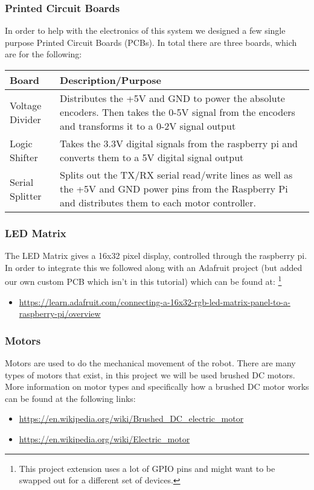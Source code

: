 \documentclass[12pt]{article}
\begin{document}
\subsubsection{Printed Circuit Boards}
In order to help with the electronics of this system we designed a few single purpose Printed Circuit Boards (PCBs). In total there are three boards, which are for the following:
\bigskip

\begin{tabular}[2]{| p{5cm} | p{10cm} | }
	\hline
	\textbf{Board} & \textbf{Description/Purpose} \\ \hline
	Voltage Divider & Distributes the +5V and GND to power the absolute encoders. Then takes the 0-5V signal from the encoders and transforms it to a 0-2V signal output \\ \hline
	Logic Shifter & Takes the 3.3V digital signals from the raspberry pi and converts them to a 5V digital signal output \\ \hline
	Serial Splitter & Splits out the TX/RX serial read/write lines as well as the +5V and GND power pins from the Raspberry Pi and distributes them to each motor controller. \\ \hline
\end{tabular}
\bigskip

\subsubsection{LED Matrix}
The LED Matrix gives a 16x32 pixel display, controlled through the raspberry pi. In order to integrate this we followed along with an Adafruit project (but added our own custom PCB which isn't in this tutorial) which can be found at: \footnote{This project extension uses a lot of GPIO pins and might want to be swapped out for a different set of devices.} 
\begin{itemize}
  \item \href{https://learn.adafruit.com/connecting-a-16x32-rgb-led-matrix-panel-to-a-raspberry-pi/overview}{https://learn.adafruit.com/connecting-a-16x32-rgb-led-matrix-panel-to-a-raspberry-pi/overview}
\end{itemize}

\subsubsection{Motors}
Motors are used to do the mechanical movement of the robot. There are many types of motors that exist, in this project we will be used brushed DC motors. More information on motor types and specifically how a brushed DC motor works can be found at the following links:
\begin{itemize}
	\item \href{https://en.wikipedia.org/wiki/Brushed_DC_electric_motor}{https://en.wikipedia.org/wiki/Brushed\_DC\_electric\_motor}
	\item \href{https://en.wikipedia.org/wiki/Electric_motor}{https://en.wikipedia.org/wiki/Electric\_motor}
\end{itemize}
\end{document}
